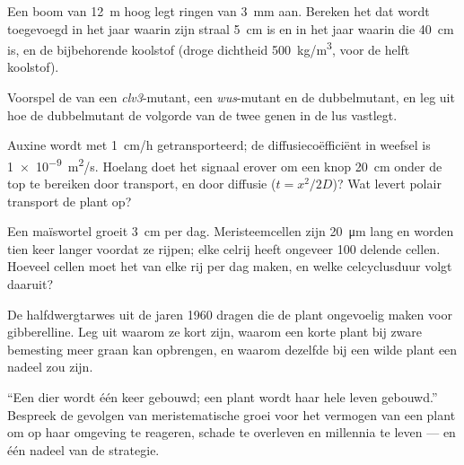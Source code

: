 \begin{exercise}[$\star\star$]\label{exo:b2:plant-meristems:7}
Een boom van \qty{12}{m} hoog legt ringen van \qty{3}{mm} aan. Bereken het
 dat wordt toegevoegd in het jaar waarin zijn straal \qty{5}{cm} is en
in het jaar waarin die \qty{40}{cm} is, en de bijbehorende koolstof (droge
dichtheid \qty{500}{kg/m^3}, voor de helft koolstof).
\end{exercise}

\begin{exercise}[$\star\star$]\label{exo:b2:plant-meristems:8}
Voorspel de  van een \emph{clv3}-mutant, een \emph{wus}-mutant en de
dubbelmutant, en leg uit hoe de dubbelmutant de volgorde van de twee genen
in de lus vastlegt.
\end{exercise}

\begin{exercise}[$\star\star$]\label{exo:b2:plant-meristems:9}
Auxine wordt met \qty{1}{cm/h} getransporteerd; de diffusiecoëfficiënt in
weefsel is \qty{1e-9}{m^2/s}. Hoelang doet het signaal erover om een knop
\qty{20}{cm} onder de top te bereiken door transport, en door diffusie
($t = x^2/2D$)? Wat levert polair transport de plant op?
\end{exercise}

\begin{exercise}[$\star\star\star$]\label{exo:b2:plant-meristems:10}
Een maïswortel groeit \qty{3}{cm} per dag. Meristeemcellen zijn
\qty{20}{\micro m} lang en worden tien keer langer voordat ze rijpen; elke
celrij heeft ongeveer \num{100} delende cellen. Hoeveel cellen moet het
 van elke rij per dag maken, en welke celcyclusduur volgt daaruit?
\end{exercise}

\begin{exercise}[$\star\star\star$]\label{exo:b2:plant-meristems:11}
De halfdwergtarwes uit de jaren 1960 dragen  die de plant
ongevoelig maken voor gibberelline. Leg uit waarom ze kort zijn, waarom een
korte plant bij zware bemesting meer graan kan opbrengen, en waarom dezelfde
 bij een wilde plant een nadeel zou zijn.
\end{exercise}

\begin{exercise}[$\star\star\star$]\label{exo:b2:plant-meristems:12}
``Een dier wordt één keer gebouwd; een plant wordt haar hele leven
gebouwd.'' Bespreek de gevolgen van meristematische groei voor het vermogen
van een plant om op haar omgeving te reageren, schade te overleven en
millennia te leven --- en één nadeel van de strategie.
\end{exercise}

